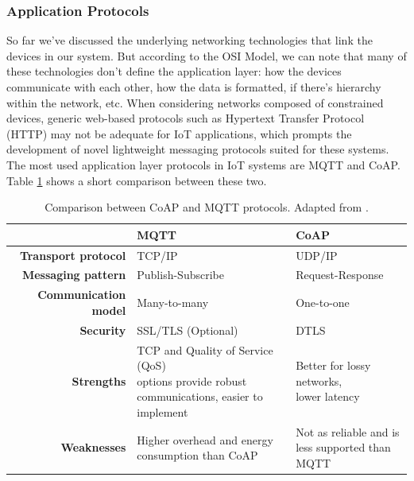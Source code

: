 

\subsubsection{Application Protocols}

So far we've discussed the underlying networking technologies that link the devices in our system. But according to the OSI Model, we can note that many of these technologies don't define the application layer: how the devices communicate with each other, how the data is formatted, if there's hierarchy within the network, etc. When considering networks composed of constrained devices, generic web-based protocols such as Hypertext Transfer Protocol (HTTP) may not be adequate for \acs{IoT} applications, which prompts the development of novel lightweight messaging protocols suited for these systems. The most used application layer protocols in \acs{IoT} systems are \acf{MQTT} and \acf{CoAP}. Table \ref{tab:comparsion-applicationprotocols} shows a short comparison between these two. \bigskip

\renewcommand{\arraystretch}{1.5}
\begin{table}[H]
    \centering
    \begin{tabular}{r|l|l}
        & \textbf{\acs{MQTT}}& \textbf{\acs{CoAP}}  \\ \hline
        \textbf{Transport protocol} & TCP/IP & UDP/IP \\
        \textbf{Messaging pattern} & Publish-Subscribe & Request-Response \\
        \textbf{Communication model} & Many-to-many & One-to-one \\
        \textbf{Security} & SSL/TLS (Optional) & DTLS \\
        \textbf{Strengths} & \makecell{TCP and Quality of Service (QoS)\\ options provide robust \\communications, easier to implement } & \makecell{Better for lossy networks,\\ lower latency} \\
        \textbf{Weaknesses} & \makecell{Higher overhead and energy\\ consumption than \acs{CoAP}} & \makecell{Not as reliable and is\\less supported than MQTT} \\
    \end{tabular}
    \caption[Comparison between \acs{CoAP} and \acs{MQTT} protocols.]{Comparison between \acs{CoAP} and \acs{MQTT} protocols. Adapted from \cite{10.5555/3161403}.}
    \label{tab:comparsion-applicationprotocols}
\end{table} 
\renewcommand{\arraystretch}{1}


